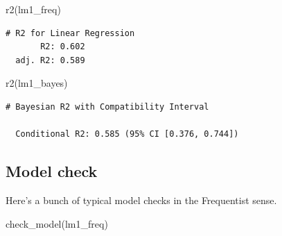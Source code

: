 \documentclass[
  letterpaper,
  DIV=11,
  numbers=noendperiod]{scrreprt}
\newenvironment{Shaded}{\begin{snugshade}}{\end{snugshade}}
\newcommand{\FunctionTok}[1]{\textcolor[rgb]{0.28,0.35,0.67}{#1}}
\newcommand{\NormalTok}[1]{\textcolor[rgb]{0.00,0.23,0.31}{#1}}
\theoremstyle{definition}
\theoremstyle{definition}
\theoremstyle{remark}
\begin{document}
\begin{Shaded}
\begin{Highlighting}[]
\FunctionTok{r2}\NormalTok{(lm1\_freq)}
\end{Highlighting}
\end{Shaded}

\begin{verbatim}
# R2 for Linear Regression
       R2: 0.602
  adj. R2: 0.589
\end{verbatim}

\begin{Shaded}
\begin{Highlighting}[]
\FunctionTok{r2}\NormalTok{(lm1\_bayes)}
\end{Highlighting}
\end{Shaded}

\begin{verbatim}
# Bayesian R2 with Compatibility Interval

  Conditional R2: 0.585 (95% CI [0.376, 0.744])
\end{verbatim}

\hypertarget{model-check}{%
\subsection{Model check}\label{model-check}}

Here's a bunch of typical model checks in the Frequentist sense.

\begin{Shaded}
\begin{Highlighting}[]
\FunctionTok{check\_model}\NormalTok{(lm1\_freq)}
\end{Highlighting}
\end{Shaded}
\end{document}
